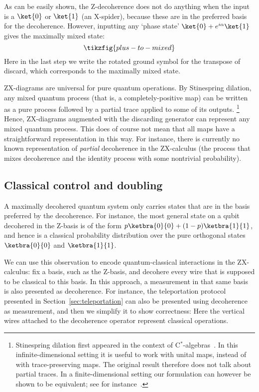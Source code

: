 \documentclass[a4paper,onecolumn,superscriptaddress,11pt,%
				unpublished,%
				allowfontchageintitle,%
				]{quantumarticle}
\begin{document}
As can be easily shown, the Z-decoherence does not do anything when the input is a $\ket{0}$ or $\ket{1}$ (an X-spider), because these are in the preferred basis for the decoherence. However, inputting any `phase state' $\ket{0} + e^{i\alpha}\ket{1}$ gives the maximally mixed state:
\begin{equation}
	\tikzfig{plus-to-mixed}
\end{equation}
Here in the last step we write the rotated ground symbol for the transpose of discard, which corresponds to the maximally mixed state.

ZX-diagrams are universal for pure quantum operations. By Stinespring dilation, any mixed quantum process (that is, a completely-positive map) can be written as a pure process followed by a partial trace applied to some of its outputs.%
\footnote{Stinespring dilation first appeared in the context of C$^*$-algebras~\cite{stinespring1955positive}. In this infinite-dimensional setting it is useful to work with unital maps, instead of with trace-preserving maps. The original result therefore does not talk about partial traces. In a finite-dimensional setting our formulation can however be shown to be equivalent; see for instance~\cite[Theorem~6.61]{CKbook}.} 
Hence, ZX-diagrams augmented with the discarding generator can represent any mixed quantum process. This does of course not mean that all maps have a straightforward representation in this way.
For instance, there is currently no known representation of \emph{partial} decoherence in the ZX-calculus (the process that mixes decoherence and the identity process with some nontrivial probability).

\subsection{Classical control and doubling}\label{sec:doubling}

A maximally decohered quantum system only carries states that are in the basis preferred by the decoherence. For instance, the most general state on a qubit decohered in the Z-basis is of the form $p \ketbra{0}{0} + (1-p)\ketbra{1}{1}$, and hence is a classical probability distribution over the pure orthogonal states $\ketbra{0}{0}$ and $\ketbra{1}{1}$.

We can use this observation to encode quantum-classical interactions in the ZX-calculus: fix a basis, such as the Z-basis, and decohere every wire that is supposed to be classical to this basis. 
In this approach, a measurement in that same basis is also presented as decoherence. For instance, the teleportation protocol presented in Section~\ref{sec:teleportation} can also be presented using decoherence as measurement, and then we simplify it to show correctness:
Here the vertical wires attached to the decoherence operator represent classical operations.
\end{document}
